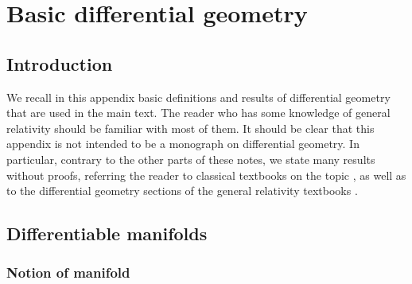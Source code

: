\chapter{Basic differential geometry} \label{s:bas}

\minitoc

\section{Introduction}

We recall in this appendix basic definitions and results of differential geometry
that are used in the main text.
The reader who has some knowledge of general relativity should be familiar with most of them.
It should be clear that this appendix is not intended to be a monograph on differential geometry.
In particular, contrary to the other parts of these notes, we state many results
without proofs,
referring the reader to classical textbooks on the topic
\cite{Lafon15,Lee13,Lee18,ONeil83,Berge03,ChoquDD82,Colli26,Eschr11}, as well as
to the differential geometry sections of the general relativity textbooks
\cite{Choqu09,Strau13,Wald84}.


\section{Differentiable manifolds} \label{s:bas:manif}

\subsection{Notion of manifold} \label{s:bas:def_manif}

